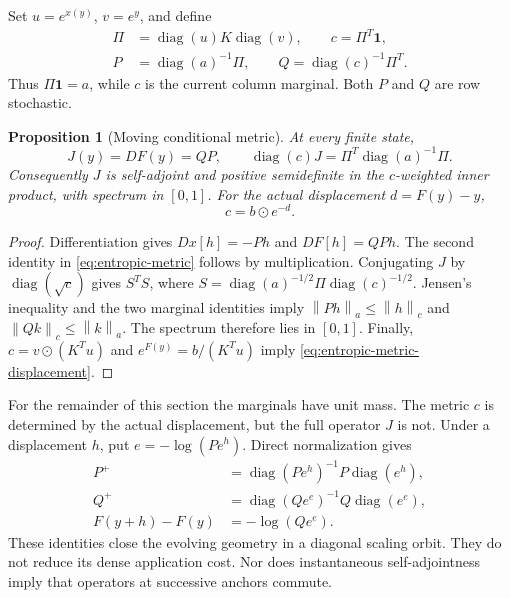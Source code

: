 \documentclass[journal]{IEEEtran}
\newtheorem{proposition}[theorem]{Proposition}
\theoremstyle{definition}
\newcommand{\norm}[1]{\left\lVert#1\right\rVert}
\DeclareMathOperator{\diag}{diag}
\begin{document}
Set $u=e^{x(y)}$, $v=e^y$, and define
\begin{equation}\begin{aligned}
 \Pi&=\diag(u)K\diag(v),\qquad c=\Pi^T\mathbf1,\\
 P&=\diag(a)^{-1}\Pi,\qquad Q=\diag(c)^{-1}\Pi^T.
\end{aligned}\label{eq:entropic-conditionals}\end{equation}
Thus $\Pi\mathbf1=a$, while $c$ is the current column marginal. Both
$P$ and $Q$ are row stochastic.

\begin{proposition}[Moving conditional metric]
\label{prop:entropic-metric}
At every finite state,
\begin{equation}
 J(y)=DF(y)=QP,\qquad
 \diag(c)J=\Pi^T\diag(a)^{-1}\Pi.
 \label{eq:entropic-metric}
\end{equation}
Consequently $J$ is self-adjoint and positive semidefinite in the
$c$-weighted inner product, with spectrum in $[0,1]$. For the actual
displacement $d=F(y)-y$,
\begin{equation}
 c=b\odot e^{-d}. \label{eq:entropic-metric-displacement}
\end{equation}
\end{proposition}
\begin{proof}
Differentiation gives $Dx[h]=-Ph$ and $DF[h]=QPh$.
The second identity in \eqref{eq:entropic-metric} follows by multiplication.
Conjugating $J$ by $\diag(\sqrt c)$ gives $S^TS$, where
$S=\diag(a)^{-1/2}\Pi\diag(c)^{-1/2}$. Jensen's inequality and the two
marginal identities imply
$\norm{Ph}_a\leq\norm h_c$ and $\norm{Qk}_c\leq\norm k_a$.
The spectrum therefore lies in $[0,1]$. Finally,
$c=v\odot(K^Tu)$ and $e^{F(y)}=b/(K^Tu)$ imply
\eqref{eq:entropic-metric-displacement}.
\end{proof}
For the remainder of this section the marginals have unit mass. The metric
$c$ is determined by the actual displacement, but the full operator $J$ is
not. Under a displacement $h$, put $e=-\log(Pe^h)$. Direct normalization gives
\begin{align}
 P^+&=\diag(Pe^h)^{-1}P\diag(e^h),\nonumber\\
 Q^+&=\diag(Qe^e)^{-1}Q\diag(e^e),\label{eq:conditional-evolution}\\
 F(y+h)-F(y)&=-\log(Qe^e).\nonumber
\end{align}
These identities close the evolving geometry in a diagonal scaling orbit.
They do not reduce its dense application cost. Nor does instantaneous
self-adjointness imply that operators at successive anchors commute.
\end{document}
